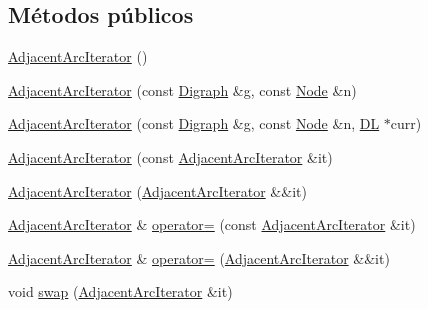 \subsection*{Métodos públicos}
\begin{DoxyCompactItemize}
\item 
\hyperlink{class_designar_1_1_digraph_1_1_adjacent_arc_iterator_a44c04d22e04c7458517a41bced9338f6}{Adjacent\+Arc\+Iterator} ()
\item 
\hyperlink{class_designar_1_1_digraph_1_1_adjacent_arc_iterator_a0e41952269f1ca89fd7647cb457cb6e2}{Adjacent\+Arc\+Iterator} (const \hyperlink{class_designar_1_1_digraph}{Digraph} \&g, const \hyperlink{class_designar_1_1_digraph_a4dc921c41a480b7946a04170e997d8ae}{Node} \&n)
\item 
\hyperlink{class_designar_1_1_digraph_1_1_adjacent_arc_iterator_ae4f0209339948fd0d1f6e6f26307ca9c}{Adjacent\+Arc\+Iterator} (const \hyperlink{class_designar_1_1_digraph}{Digraph} \&g, const \hyperlink{class_designar_1_1_digraph_a4dc921c41a480b7946a04170e997d8ae}{Node} \&n, \hyperlink{class_designar_1_1_d_l}{DL} $\ast$curr)
\item 
\hyperlink{class_designar_1_1_digraph_1_1_adjacent_arc_iterator_acf32a4ea55f99c576876e4c7d981ec70}{Adjacent\+Arc\+Iterator} (const \hyperlink{class_designar_1_1_digraph_1_1_adjacent_arc_iterator}{Adjacent\+Arc\+Iterator} \&it)
\item 
\hyperlink{class_designar_1_1_digraph_1_1_adjacent_arc_iterator_a43dfb1bed036cb0c417905526727883f}{Adjacent\+Arc\+Iterator} (\hyperlink{class_designar_1_1_digraph_1_1_adjacent_arc_iterator}{Adjacent\+Arc\+Iterator} \&\&it)
\item 
\hyperlink{class_designar_1_1_digraph_1_1_adjacent_arc_iterator}{Adjacent\+Arc\+Iterator} \& \hyperlink{class_designar_1_1_digraph_1_1_adjacent_arc_iterator_a2f354557278794bdd4bfc2c43c236814}{operator=} (const \hyperlink{class_designar_1_1_digraph_1_1_adjacent_arc_iterator}{Adjacent\+Arc\+Iterator} \&it)
\item 
\hyperlink{class_designar_1_1_digraph_1_1_adjacent_arc_iterator}{Adjacent\+Arc\+Iterator} \& \hyperlink{class_designar_1_1_digraph_1_1_adjacent_arc_iterator_a4dddbdfac352389f4fe7bf7f809c5655}{operator=} (\hyperlink{class_designar_1_1_digraph_1_1_adjacent_arc_iterator}{Adjacent\+Arc\+Iterator} \&\&it)
\item 
void \hyperlink{class_designar_1_1_digraph_1_1_adjacent_arc_iterator_a115f64297073bcdf6724045da1487d85}{swap} (\hyperlink{class_designar_1_1_digraph_1_1_adjacent_arc_iterator}{Adjacent\+Arc\+Iterator} \&it)

\end{DoxyCompactItemize}
